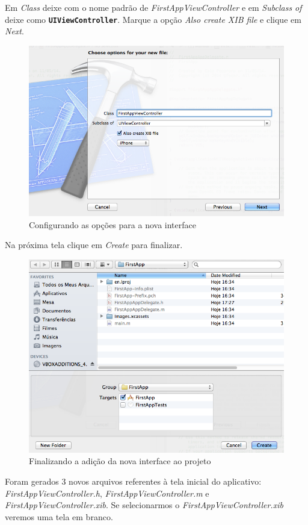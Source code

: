 \documentclass[a4paper,12pt,brazil,oneside]{book}
\begin{document}
Em \emph{Class} deixe com o nome padrão de \emph{FirstAppViewController} e em \emph{Subclass of} deixe como \texttt{\textbf{UIViewController}}. Marque a opção \emph{Also create XIB file} e clique em \emph{Next}.

\begin{figure}[H]
  \centering
  \includegraphics[width=.75\textwidth]{figuras/3/tela_novo_projeto_8.png}
  \caption{Configurando as opções para a nova interface}
  \label{fig:a}
\end{figure}


Na próxima tela clique em \emph{Create} para finalizar.

\begin{figure}[H]
  \centering
  \includegraphics[width=.75\textwidth]{figuras/3/tela_novo_projeto_9.png}
  \caption{Finalizando a adição da nova interface ao projeto}
  \label{fig:a}
\end{figure}


Foram gerados 3 novos arquivos referentes à tela inicial do aplicativo: \emph{FirstAppViewController.h}, \emph{FirstAppViewController.m} e \emph{FirstAppViewController.xib}. Se selecionarmos o \emph{FirstAppViewController.xib} veremos uma tela em branco.
\end{document}

